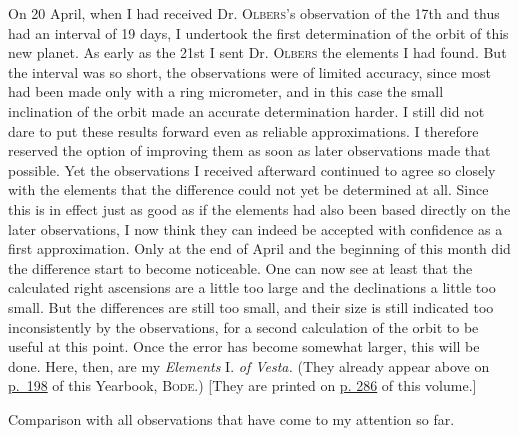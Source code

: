 \par\indent On 20 April, when I had received Dr. \textsc{Olbers}’s observation of the 17th and thus had an interval of 19 days, I undertook the first determination of the orbit of this new planet. As early as the 21st I sent Dr. \textsc{Olbers} the elements I had found. But the interval was so short, the observations were of limited accuracy, since most had been made only with a ring micrometer, and in this case the small inclination of the orbit made an accurate determination harder. I still did not dare to put these results forward even as reliable approximations. I therefore reserved the option of improving them as soon as later observations made that possible. Yet the observations I received afterward continued to agree so closely with the elements that the difference could not yet be determined at all. Since this is in effect just as good as if the elements had also been based directly on the later observations, I now think they can indeed be accepted with confidence as a first approximation. Only at the end of April and the beginning of this month did the difference start to become noticeable. One can now see at least that the calculated right ascensions are a little too large and the declinations a little too small. But the differences are still too small, and their size is still indicated too inconsistently by the observations, for a second calculation of the orbit to be useful at this point. Once the error has become somewhat larger, this will be done. Here, then, are my \emph{Elements} I. \emph{of Vesta.} (They already appear above on \href{https://www.digitale-sammlungen.de/en/view/bsb10538339?page=208}{p.~198} of this Yearbook, \textsc{Bode}.) [They are printed on \hyperlink{vesta1807-first-elements}{p. 286} of this volume.]
\par\Needspace{70pt}
%
\par\medskip\noindent Comparison with all observations that have come to my attention so far.

